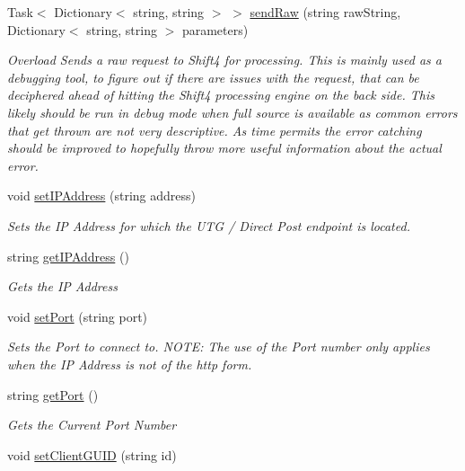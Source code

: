 \begin{DoxyCompactItemize}
Task$<$ Dictionary$<$ string, string $>$ $>$ \mbox{\hyperlink{interface_form_sim_1_1_f_r_c___handler_ad4b9146b6142d1d6ded15e5de4ed4675}{send\+Raw}} (string raw\+String, Dictionary$<$ string, string $>$ parameters)
\begin{DoxyCompactList}\small\item\em Overload Sends a raw request to Shift4 for processing. This is mainly used as a debugging tool, to figure out if there are issues with the request, that can be deciphered ahead of hitting the Shift4 processing engine on the back side. This likely should be run in debug mode when full source is available as common errors that get thrown are not very descriptive. As time permits the error catching should be improved to hopefully throw more useful information about the actual error. \end{DoxyCompactList}\item 
void \mbox{\hyperlink{interface_form_sim_1_1_f_r_c___handler_a702c2593fce6995a49f0fb509a2c7605}{set\+I\+P\+Address}} (string address)
\begin{DoxyCompactList}\small\item\em Sets the IP Address for which the U\+TG / Direct Post endpoint is located. \end{DoxyCompactList}\item 
string \mbox{\hyperlink{interface_form_sim_1_1_f_r_c___handler_ab4c19dd9eb34e0375b8a436fd01b79d0}{get\+I\+P\+Address}} ()
\begin{DoxyCompactList}\small\item\em Gets the IP Address \end{DoxyCompactList}\item 
void \mbox{\hyperlink{interface_form_sim_1_1_f_r_c___handler_a0a0a83b20fd2b3ec4ef9bbe5f5549b35}{set\+Port}} (string port)
\begin{DoxyCompactList}\small\item\em Sets the Port to connect to. N\+O\+TE\+: The use of the Port number only applies when the IP Address is not of the http form. \end{DoxyCompactList}\item 
string \mbox{\hyperlink{interface_form_sim_1_1_f_r_c___handler_add0725551d06bb4cfb33c23bef426814}{get\+Port}} ()
\begin{DoxyCompactList}\small\item\em Gets the Current Port Number \end{DoxyCompactList}\item 
void \mbox{\hyperlink{interface_form_sim_1_1_f_r_c___handler_a3c77b2e99c98553928e463a9cbb5f7d4}{set\+Client\+G\+U\+ID}} (string id)

\end{DoxyCompactItemize}
